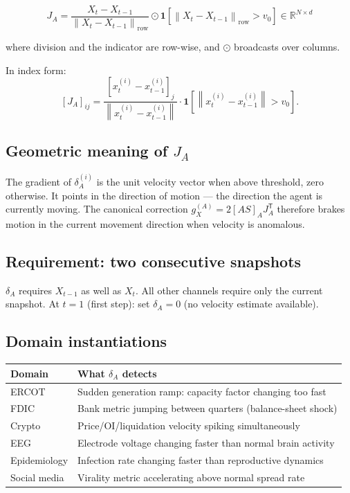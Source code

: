 \documentclass[11pt,a4paper]{article}
\theoremstyle{definition}
\newcommand{\R}{\mathbb{R}}
\newcommand{\T}{^{\mathsf{T}}}
\newcommand{\norm}[1]{\left\|#1\right\|}
\begin{document}
\[
J_A = \frac{X_t - X_{t-1}}{\norm{X_t - X_{t-1}}_\mathrm{row}} \odot \mathbf{1}[\norm{X_t-X_{t-1}}_\mathrm{row} > v_0] \in \R^{N\times d}
\]

where division and the indicator are row-wise, and $\odot$ broadcasts over columns.

In index form:
\[
[J_A]_{ij} = \frac{[x_t^{(i)}-x_{t-1}^{(i)}]_j}{\norm{x_t^{(i)}-x_{t-1}^{(i)}}} \cdot \mathbf{1}[\norm{x_t^{(i)}-x_{t-1}^{(i)}} > v_0].
\]

\subsection{Geometric meaning of $J_A$}

The gradient of $\delta_A^{(i)}$ is the unit velocity vector when above threshold, zero otherwise.
It points in the direction of motion — the direction the agent is currently moving.
The canonical correction $g_X^{(A)} = 2[AS]_A J_A\T$ therefore brakes motion
in the current movement direction when velocity is anomalous.

\subsection{Requirement: two consecutive snapshots}

$\delta_A$ requires $X_{t-1}$ as well as $X_t$.
All other channels require only the current snapshot.
At $t=1$ (first step): set $\delta_A = 0$ (no velocity estimate available).

\subsection{Domain instantiations}

\begin{center}
\begin{tabular}{ll}
\toprule
Domain & What $\delta_A$ detects \\
\midrule
ERCOT & Sudden generation ramp: capacity factor changing too fast \\
FDIC & Bank metric jumping between quarters (balance-sheet shock) \\
Crypto & Price/OI/liquidation velocity spiking simultaneously \\
EEG & Electrode voltage changing faster than normal brain activity \\
Epidemiology & Infection rate changing faster than reproductive dynamics \\
Social media & Virality metric accelerating above normal spread rate \\
\bottomrule
\end{tabular}
\end{center}
\end{document}
